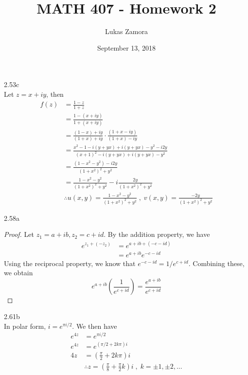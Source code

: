 \documentclass{article}
\title{MATH 407 - Homework 2}
\author{Lukas Zamora}
\date{September 13, 2018}
\theoremstyle{definition}
\begin{document}
    \maketitle
    
    \begin{prob}{2.53c} $  $ \vspace{1mm} \\
    	Let $ z = x+iy $, then
    	\begin{align*}
    		f(z) & = \frac{1-z}{1+z} \\
    		     & = \frac{1-(x+iy)}{1+(x+iy)} \\
    		     & = \frac{(1-x) + iy}{(1+x) + iy} \cdot \frac{(1+x - iy)}{(1+x) - iy} \\
    		     & = \frac{x^2 - 1 -i (y+yx) + i(y+yx) - y^2 - i2y}{(x+1)^2 - i(y+yx) + i(y+yx) - y^2} \\
    		     & = \frac{(1 - x^2 - y^2) - i2y}{(1+x^2)^2 + y^2} \\
    		     & = \frac{1-x^2-y^2}{(1+x^2)^2 + y^2} - i \frac{2y}{(1+x^2)^2 + y^2} \\
    		     & \therefore \boxed{u(x,y) = \frac{1-x^2-y^2}{(1+x^2)^2 + y^2} \; , \; v(x,y) = \frac{-2y}{(1+x^2)^2 + y^2} }
    	\end{align*}
   	\end{prob}
   
   	\begin{prob}{2.58a} $  $
   		\begin{proof}
   			Let $ z_1 = a+ib, z_2 = c+id $. By the addition property, we have 
   			\begin{align*}
   				e^{z_1 + (-z_2)} & = e^{a+ib + (-c-id)} \\
   								 & = e^{a+ib} e^{-c-id}
   			\end{align*}
   			Using the reciprocal property, we know that $ e^{-c-id} = 1/e^{c+id} $. Combining these, we obtain
   			\[
   				e^{a+ib} \left( \frac{1}{e^{c+id}} \right) = \frac{e^{a+ib}}{e^{c+id}}
   			\]
   		\end{proof}
   	\end{prob}
   
   \begin{prob}{2.61b} $  $ \vspace{1mm} \\ 
		 In polar form, $ i = e^{\pi i/2} $. We then have 
		 \begin{align*}
		 	e^{4z} & = e^{\pi i/2} \\
		 	e^{4z} & = e^{(\pi/2 + 2k\pi)i} \\
		 		4z & = \left( \frac{\pi}{2} + 2k\pi \right)i \\
		 		   & \therefore \boxed{z = \left( \frac{\pi}{8} + \frac{\pi}{2}k \right)i \; , \; k = \pm 1, \pm 2, \dots }
		 \end{align*}
   \end{prob}
\end{document}

